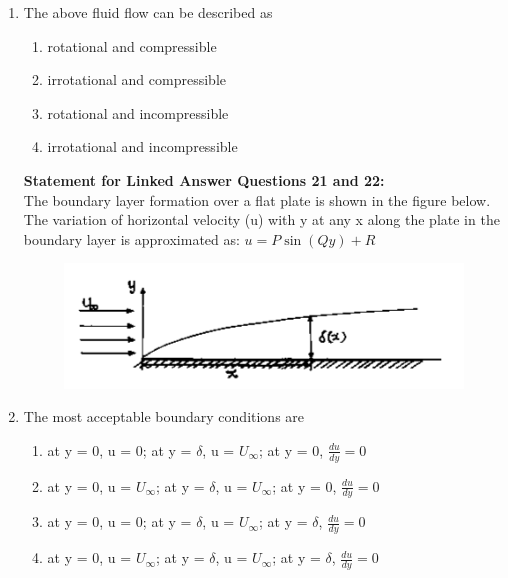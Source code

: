 \documentclass[a4paper,10pt]{article}
\begin{document}
\begin{enumerate}
\begin{multicols}{4}
\begin{enumerate}
\item 1.414
\item 2.38
\item 1.19
\item 11.90
\end{enumerate}
\end{multicols}

\item The above fluid flow can be described as
\hfill{}

\begin{multicols}{2}
\begin{enumerate}
\item rotational and compressible
\item irrotational and compressible
\item rotational and incompressible
\item irrotational and incompressible
\end{enumerate}
\end{multicols}

\textbf{Statement for Linked Answer Questions 21 and 22:} \\
The boundary layer formation over a flat plate is shown in the figure below. The variation of horizontal velocity (u) with y at any x along the plate in the boundary layer is approximated as: $u = P \sin(Qy) + R$
\begin{figure}[H]
    \centering
    \includegraphics[width=0.6\columnwidth]{Bq21_22.png}
    \caption*{}
    \label{fig:q21_22}
\end{figure}

\item The most acceptable boundary conditions are
\hfill{}

\begin{enumerate}
\item at y = 0, u = 0; at y = $\delta$, u = $U_\infty$; at y = 0, $\frac{du}{dy} = 0$
\item at y = 0, u = $U_\infty$; at y = $\delta$, u = $U_\infty$; at y = 0, $\frac{du}{dy} = 0$
\item at y = 0, u = 0; at y = $\delta$, u = $U_\infty$; at y = $\delta$, $\frac{du}{dy} = 0$
\item at y = 0, u = $U_\infty$; at y = $\delta$, u = $U_\infty$; at y = $\delta$, $\frac{du}{dy} = 0$
\end{enumerate}


\end{enumerate}
\end{document}
